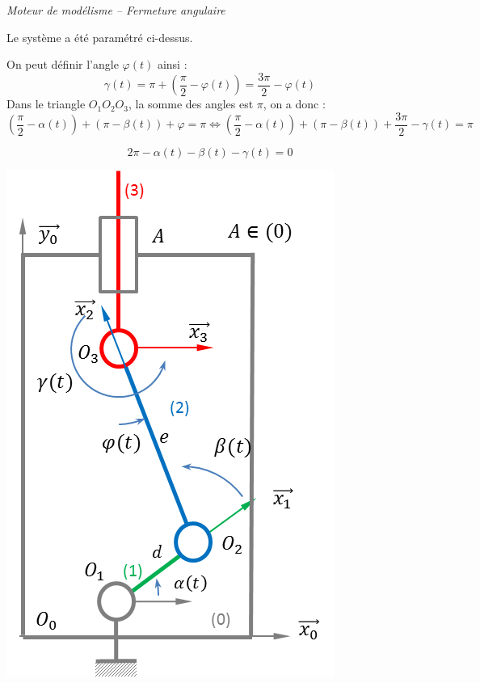 \documentclass[10pt,oneside]{article}
\begin{document}
\begin{exemple}
\textit{Moteur de modélisme -- Fermeture angulaire}

\begin{minipage}[c]{.6\linewidth}
Le système a été paramétré ci-dessus. 

On peut définir l'angle $\varphi(t)$ ainsi :
$$
\gamma(t)
=\pi + \left(\dfrac{\pi}{2}-\varphi(t)\right)
= \dfrac{3 \pi}{2}-\varphi(t)
$$
Dans le triangle $O_1 O_2 O_3$, la somme des angles est $\pi$, on a donc : 
$$
\left( \dfrac{\pi}{2} - \alpha(t) \right) + \left(\pi-\beta(t)\right) + \varphi = \pi
\Longleftrightarrow
\left( \dfrac{\pi}{2} - \alpha(t) \right) + \left(\pi-\beta(t)\right) +  \dfrac{3 \pi}{2}-\gamma(t) = \pi
$$

$$
2\pi - \alpha(t) -\beta(t) -\gamma(t) = 0
$$


\end{minipage}\hfill
\begin{minipage}[c]{.35\linewidth}
\begin{center}
\includegraphics[width=.9\textwidth]{png/chaine}
\end{center}
\end{minipage}
\end{exemple}
\end{document}
